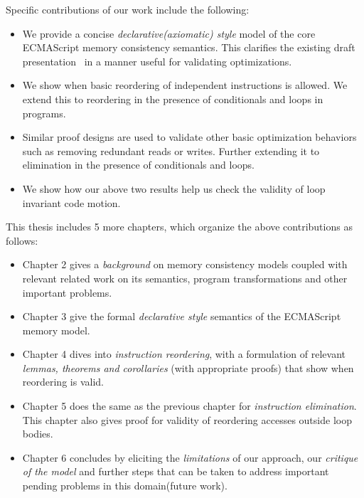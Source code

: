 Specific contributions of our work include the following:
\begin{itemize}
    \item We provide a concise \textit{declarative(axiomatic) style} model of the core ECMAScript memory consistency semantics. This clarifies the existing draft presentation~\cite{ECMA} in a manner useful for validating optimizations.
    \item We show when basic reordering of independent instructions is allowed. We extend this to reordering in the presence of conditionals and loops in programs.
    \item Similar proof designs are used to validate other basic optimization behaviors such as removing redundant reads or writes. Further extending it to elimination in the presence of conditionals and loops. 
    \item We show how our above two results help us check the validity of loop invariant code motion. 
\end{itemize}

This thesis includes 5 more chapters, which organize the above contributions as follows:
\begin{itemize}
    \item Chapter 2 gives a \textit{background} on memory consistency models coupled with relevant related work on its semantics, program transformations and other important problems.
    \item Chapter 3 give the formal \textit{declarative style} semantics of the ECMAScript memory model.
    \item Chapter 4 dives into \textit{instruction reordering}, with a formulation of relevant \textit{lemmas, theorems and corollaries} (with appropriate proofs) that show when reordering is valid.
    \item Chapter 5 does the same as the previous chapter for \textit{instruction elimination}. This chapter also gives proof for validity of reordering accesses outside loop bodies. 
    \item Chapter 6 concludes by eliciting the \textit{limitations} of our approach, our \textit{critique of the model} and further steps that can be taken to address important pending problems in this domain(future work).
\end{itemize}